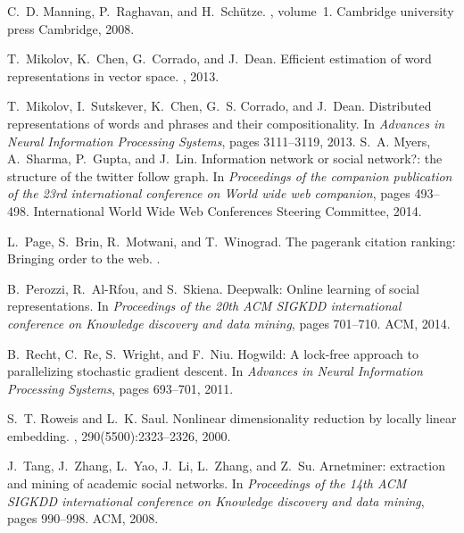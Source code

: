 \documentclass{sig-alternate-2013}
\begin{document}
\begin{thebibliography}{10}
	C.~D. Manning, P.~Raghavan, and H.~Sch{\"u}tze.
	, volume~1.
	\newblock Cambridge university press Cambridge, 2008.
	
	T.~Mikolov, K.~Chen, G.~Corrado, and J.~Dean.
	\newblock Efficient estimation of word representations in vector space.
	, 2013.
	
	T.~Mikolov, I.~Sutskever, K.~Chen, G.~S. Corrado, and J.~Dean.
	\newblock Distributed representations of words and phrases and their
	compositionality.
	\newblock In {\em Advances in Neural Information Processing Systems}, pages
	3111--3119, 2013.
	\vfill\eject 
	S.~A. Myers, A.~Sharma, P.~Gupta, and J.~Lin.
	\newblock Information network or social network?: the structure of the twitter
	follow graph.
	\newblock In {\em Proceedings of the companion publication of the 23rd
		international conference on World wide web companion}, pages 493--498.
	International World Wide Web Conferences Steering Committee, 2014.
	
	L.~Page, S.~Brin, R.~Motwani, and T.~Winograd.
	\newblock The pagerank citation ranking: Bringing order to the web.
	.
	
	B.~Perozzi, R.~Al-Rfou, and S.~Skiena.
	\newblock Deepwalk: Online learning of social representations.
	\newblock In {\em Proceedings of the 20th ACM SIGKDD international conference
		on Knowledge discovery and data mining}, pages 701--710. ACM, 2014.
	
	B.~Recht, C.~Re, S.~Wright, and F.~Niu.
	\newblock Hogwild: A lock-free approach to parallelizing stochastic gradient
	descent.
	\newblock In {\em Advances in Neural Information Processing Systems}, pages
	693--701, 2011.
	
	S.~T. Roweis and L.~K. Saul.
	\newblock Nonlinear dimensionality reduction by locally linear embedding.
	, 290(5500):2323--2326, 2000.
	
	J.~Tang, J.~Zhang, L.~Yao, J.~Li, L.~Zhang, and Z.~Su.
	\newblock Arnetminer: extraction and mining of academic social networks.
	\newblock In {\em Proceedings of the 14th ACM SIGKDD international conference
		on Knowledge discovery and data mining}, pages 990--998. ACM, 2008.
	

\end{thebibliography}
\end{document}
